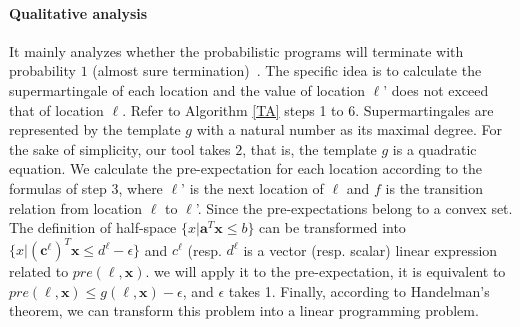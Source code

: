 \documentclass[sigconf,review, anonymous]{acmart}
\begin{document}
\paragraph{Qualitative analysis} It mainly analyzes whether the probabilistic programs will terminate with probability $1$ (almost sure termination)~\cite{Hurd2002A}. The specific idea is to calculate the supermartingale of each location and the value of location $\ell$' does not exceed that of location $\ell$. Refer to Algorithm \ref{TA} steps 1 to 6. Supermartingales are represented by the template $g$ with a natural number as its maximal degree. For the sake of simplicity, our tool takes $2$, that is, the template $g$ is a quadratic equation. We calculate the pre-expectation for each location according to the formulas of step $3$, where $\ell$' is the next location of $\ell$ and $f$ is the transition relation from location $\ell$ to $\ell$'. Since the pre-expectations belong to a convex set. The definition of half-space $\{x|\textbf{a}^T\textbf{x}\leq b\}$ can be transformed into $\{x|(\textbf{c}^\ell)^T\textbf{x} \leq d^\ell-\epsilon\}$ and $c^\ell$ (resp. $d^\ell$ is a vector (resp. scalar) linear expression related to $pre(\ell,\boldsymbol{x})$. we will apply it to the pre-expectation, it is equivalent to $pre(\ell,\boldsymbol{x}) \leq g(\ell,\boldsymbol{x})-\epsilon$, and $\epsilon$ takes 1. Finally, according to Handelman's theorem, we can transform this problem into a linear programming problem.
\end{document}
